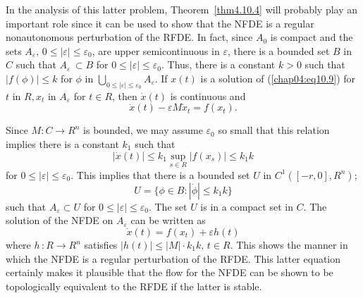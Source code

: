 \documentclass{surv-l}
\theoremstyle{plain}
\theoremstyle{definition}
\numberwithin{equation}{section}
\numberwithin{figure}{chapter}
\begin{document}
In the analysis of this latter problem, Theorem~\ref{thm4.10.4} will probably play an important role since it can be used to show that the NFDE is a regular nonautonomous perturbation of the RFDE. In fact, since $A_{0}$ is compact and the sets $A_{\varepsilon},\, 0\leq|\varepsilon|\leq\varepsilon_{0}$, are upper semicontinuous in $\varepsilon$, there is a bounded set $B$ in $C$ such that $A_{\varepsilon}\,\subset B$ for $0\leq|\varepsilon|\leq\varepsilon_{0}$. Thus, there is a constant $k>0$ such that $|f(\phi)|\leq k$ for $\phi$ in $\bigcup_{0\leq|\varepsilon|\leq\varepsilon_{0}}A_{\varepsilon}$. If $x(t)$ is a solution of (\ref{chap04:eq10.9}) for $t$ in $R, x_{t}$ in $A_{\varepsilon}$ for $t\in R$, then $\dot{x}(t)$ is continuous and
\begin{equation*}
\dot{x}(t)-\varepsilon M\dot{x}_{t}=f(x_{t}).
\end{equation*}

Since $M:C\rightarrow R^{n}$ is bounded, we may assume $\varepsilon_{0}$ so small that this relation implies there is a constant $k_{1}$ such that
\begin{equation*}
|\dot{x}(t)|\leq k_{1}\sup_{s\in R}|f(x_{s})|\leq k_{1}k
\end{equation*}
for $0\leq|\varepsilon|\leq\varepsilon_{0}$. This implies that there is a bounded set $U$ in $C^{1}([-r, 0], R^{n})$;
\begin{equation*}
U=\{\phi\in B:|\dot{\phi}|\leq k_{1}k\}
\end{equation*}
such that $A_{\varepsilon}\subset U$ for $0\leq|\varepsilon|\leq\varepsilon_{0}$. The set $U$ is in a compact set in $C$. The solution of the NFDE on $A_{\varepsilon}$ can be written as
\begin{equation*}
\dot{x}(t)=f(x_{t})+\varepsilon h(t)
\end{equation*}
where $h$\,:\,$R\rightarrow R^{n}$ satisfies $|h(t)|\leq|M|\cdot k_{1}k,\, t\in R$. This shows the manner in which the NFDE is a regular perturbation of the RFDE. This latter equation certainly makes it plausible that the flow for the NFDE can be shown to be topologically equivalent to the RFDE if the latter is stable.
\end{document}
